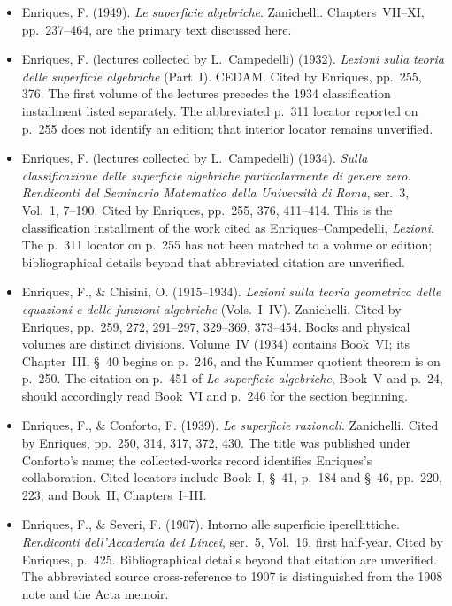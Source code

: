 \begin{sloppypar}
\begin{itemize}
\item Enriques, F. (1949). \emph{Le superficie algebriche}. Zanichelli. Chapters~VII--XI, pp.~237--464, are the primary text discussed here.

\item Enriques, F. (lectures collected by L.~Campedelli) (1932). \emph{Lezioni sulla teoria delle superficie algebriche} (Part~I). CEDAM. Cited by Enriques, pp.~255, 376. The first volume of the lectures precedes the 1934 classification installment listed separately. The abbreviated p.~311 locator reported on p.~255 does not identify an edition; that interior locator remains unverified.

\item Enriques, F. (lectures collected by L.~Campedelli) (1934). \emph{Sulla classificazione delle superficie algebriche particolarmente di genere zero}. \emph{Rendiconti del Seminario Matematico della Università di Roma}, ser.~3, Vol.~1, 7--190. Cited by Enriques, pp.~255, 376, 411--414. This is the classification installment of the work cited as Enriques--Campedelli, \emph{Lezioni}. The p.~311 locator on p.~255 has not been matched to a volume or edition; bibliographical details beyond that abbreviated citation are unverified.

\item Enriques, F., \& Chisini, O. (1915--1934). \emph{Lezioni sulla teoria geometrica delle equazioni e delle funzioni algebriche} (Vols.~I--IV). Zanichelli. Cited by Enriques, pp.~259, 272, 291--297, 329--369, 373--454. Books and physical volumes are distinct divisions. Volume~IV (1934) contains Book~VI; its Chapter~III, \S~40 begins on p.~246, and the Kummer quotient theorem is on p.~250. The citation on p.~451 of \emph{Le superficie algebriche}, Book~V and p.~24, should accordingly read Book~VI and p.~246 for the section beginning.

\item Enriques, F., \& Conforto, F. (1939). \emph{Le superficie razionali}. Zanichelli. Cited by Enriques, pp.~250, 314, 317, 372, 430. The title was published under Conforto's name; the collected-works record identifies Enriques's collaboration. Cited locators include Book~I, \S~41, p.~184 and \S~46, pp.~220, 223; and Book~II, Chapters~I--III.

\item Enriques, F., \& Severi, F. (1907). Intorno alle superficie iperellittiche. \emph{Rendiconti dell'Accademia dei Lincei}, ser.~5, Vol.~16, first half-year. Cited by Enriques, p.~425. Bibliographical details beyond that citation are unverified. The abbreviated source cross-reference to 1907 is distinguished from the 1908 note and the Acta memoir.


\end{itemize}
\end{sloppypar}
